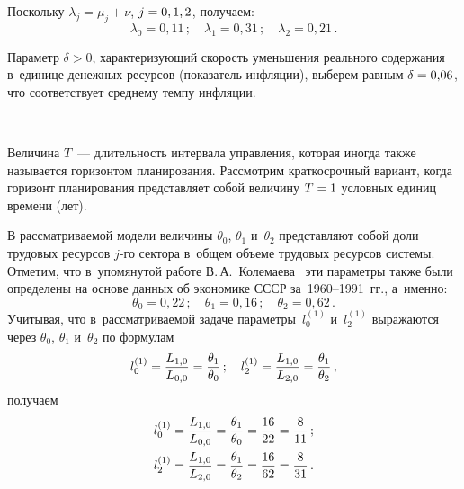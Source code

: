 \begin{multicols}{2}
Поскольку $\lambda_j= \mu_j + \nu$, $j\hm=0,1,2$, получаем:
$$
\lambda_0=0{,}11\,; \quad \lambda_1=0{,}31\,; \quad \lambda_2=0{,}21\,.
$$

Параметр $\delta >0$, характеризующий скорость уменьшения реального 
содержания в~единице денежных ресурсов (показатель инфляции), выберем равным 
$\delta\hm=0{,}06$, что соответствует среднему темпу инфляции.

\begin{figure*}[b] %
 \vspace*{1pt}
 \begin{center}
 \mbox{%
 \epsfxsize=160.121mm
 }
 \end{center}
 \vspace*{-9pt}
\end{figure*}

Величина $T$~--- длительность интервала управления, которая иногда также называется 
горизонтом планирования. Рассмотрим краткосрочный вариант, когда горизонт планирования 
представляет собой величину $T\hm=1$ условных единиц времени (лет).

В рассматриваемой модели величины  $\theta_0$, $\theta_1$ и~$\theta_2$ 
представляют собой доли трудовых ресурсов $j$-го сектора в~общем объеме 
трудовых ресурсов системы. Отметим, что в~упомянутой работе В.\,А.~Колемаева~\cite{12-gor} 
эти параметры также были определены на основе данных об экономике СССР 
за~1960--1991~гг., а~именно:
\begin{equation*} 
\theta_0=0{,}22\,; \quad \theta_1=0{,}16\,; \quad \theta_2=0{,}62\,.
\end{equation*}
Учитывая, что в~рассматриваемой задаче пара\-мет\-ры~$l^{(1)}_{0}$ и~$l^{(1)}_{2}$ 
выражаются через $\theta_0$, $\theta_1$ и~$\theta_2$  по формулам
\begin{equation*}
l^{(1)}_{0}=\displaystyle\frac{\displaystyle L_{1,0}\mathstrut}{\displaystyle L_{0,0}\mathstrut}=\displaystyle\frac{\displaystyle \theta_1\mathstrut}{\displaystyle \theta_0\mathstrut}\,; \quad
l^{(1)}_{2}=\displaystyle\frac{\displaystyle L_{1,0}\mathstrut}{\displaystyle L_{2,0}\mathstrut}=\displaystyle\frac{\displaystyle \theta_1\mathstrut}{\displaystyle \theta_2\mathstrut}\,,
\end{equation*}
получаем
\begin{gather*}
l^{(1)}_{0}=\displaystyle\frac{\displaystyle L_{1,0}\mathstrut}{\displaystyle L_{0,0}\mathstrut}=\displaystyle\frac{\displaystyle \theta_1\mathstrut}{\displaystyle \theta_0\mathstrut}=\displaystyle\frac{\displaystyle 16\mathstrut}{\displaystyle 22\mathstrut}=\displaystyle\frac{\displaystyle 8\mathstrut}{\displaystyle 11\mathstrut}\,; \\
l^{(1)}_{2}=\displaystyle\frac{\displaystyle L_{1,0}\mathstrut}{\displaystyle L_{2,0}\mathstrut}=\displaystyle\frac{\displaystyle \theta_1\mathstrut}{\displaystyle \theta_2\mathstrut}=\displaystyle\frac{\displaystyle 16\mathstrut}{\displaystyle 62\mathstrut}=\displaystyle\frac{\displaystyle 8\mathstrut}{\displaystyle 31\mathstrut}\,.
\end{gather*}


\end{multicols}
